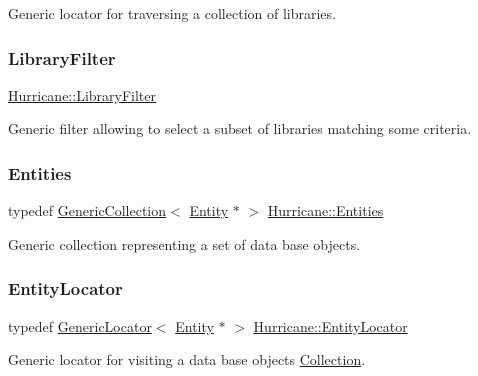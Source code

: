 Generic locator for traversing a collection of libraries. \mbox{\label{namespaceHurricane_a72d63f6bfd54feac2663e60430fd443d}} 
\subsubsection{\texorpdfstring{Library\+Filter}{LibraryFilter}}
{\footnotesize\ttfamily \mbox{\hyperlink{namespaceHurricane_a72d63f6bfd54feac2663e60430fd443d}{Hurricane\+::\+Library\+Filter}}}

Generic filter allowing to select a subset of libraries matching some criteria. \mbox{\label{namespaceHurricane_af50ef2888fd2a5b58b0de14cdfaabc56}} 
\subsubsection{\texorpdfstring{Entities}{Entities}}
{\footnotesize\ttfamily typedef \mbox{\hyperlink{classHurricane_1_1GenericCollection}{Generic\+Collection}}$<$ \mbox{\hyperlink{classHurricane_1_1Entity}{Entity}} $\ast$ $>$ \mbox{\hyperlink{namespaceHurricane_af50ef2888fd2a5b58b0de14cdfaabc56}{Hurricane\+::\+Entities}}}

Generic collection representing a set of data base objects. \mbox{\label{namespaceHurricane_ad3f039057bc40adfd993d83ace24fb83}} 
\subsubsection{\texorpdfstring{Entity\+Locator}{EntityLocator}}
{\footnotesize\ttfamily typedef \mbox{\hyperlink{classHurricane_1_1GenericLocator}{Generic\+Locator}}$<$ \mbox{\hyperlink{classHurricane_1_1Entity}{Entity}} $\ast$ $>$ \mbox{\hyperlink{namespaceHurricane_ad3f039057bc40adfd993d83ace24fb83}{Hurricane\+::\+Entity\+Locator}}}

Generic locator for visiting a data base objects \mbox{\hyperlink{classHurricane_1_1Collection}{Collection}}. \mbox{\label{namespaceHurricane_af0fe741a1ef28dedcb26bf979b1dea5c}} 
